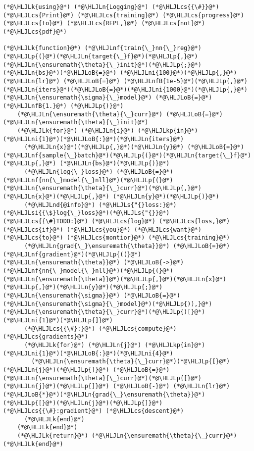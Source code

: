 \documentclass[12pt,a4paper]{article}
\newcommand{\HLJLk}[1]{\textcolor[RGB]{148,91,176}{\textbf{#1}}}
\newcommand{\HLJLkp}[1]{\textcolor[RGB]{148,91,176}{\textbf{#1}}}
\newcommand{\HLJLn}[1]{#1}
\newcommand{\HLJLnd}[1]{\textcolor[RGB]{214,102,97}{#1}}
\newcommand{\HLJLnf}[1]{\textcolor[RGB]{66,102,213}{#1}}
\newcommand{\HLJLs}[1]{\textcolor[RGB]{201,61,57}{#1}}
\newcommand{\HLJLsi}[1]{#1}
\newcommand{\HLJLnfB}[1]{\textcolor[RGB]{59,151,46}{#1}}
\newcommand{\HLJLni}[1]{\textcolor[RGB]{59,151,46}{#1}}
\newcommand{\HLJLoB}[1]{\textcolor[RGB]{102,102,102}{\textbf{#1}}}
\newcommand{\HLJLp}[1]{#1}
\newcommand{\HLJLcs}[1]{\textcolor[RGB]{153,153,119}{\textit{#1}}}
\begin{document}
\begin{lstlisting}
(*@\HLJLk{using}@*) (*@\HLJLn{Logging}@*) (*@\HLJLcs{{\#}}@*) (*@\HLJLcs{Print}@*) (*@\HLJLcs{training}@*) (*@\HLJLcs{progress}@*) (*@\HLJLcs{to}@*) (*@\HLJLcs{REPL,}@*) (*@\HLJLcs{not}@*) (*@\HLJLcs{pdf}@*)

(*@\HLJLk{function}@*) (*@\HLJLnf{train{\_}nn{\_}reg}@*)(*@\HLJLp{(}@*)(*@\HLJLn{target{\_}f}@*)(*@\HLJLp{,}@*) (*@\HLJLn{\ensuremath{\theta}{\_}init}@*)(*@\HLJLp{;}@*) (*@\HLJLn{bs}@*)(*@\HLJLoB{=}@*) (*@\HLJLni{100}@*)(*@\HLJLp{,}@*) (*@\HLJLn{lr}@*) (*@\HLJLoB{=}@*) (*@\HLJLnfB{1e-5}@*)(*@\HLJLp{,}@*) (*@\HLJLn{iters}@*)(*@\HLJLoB{=}@*)(*@\HLJLni{1000}@*)(*@\HLJLp{,}@*) (*@\HLJLn{\ensuremath{\sigma}{\_}model}@*) (*@\HLJLoB{=}@*) (*@\HLJLnfB{1.}@*) (*@\HLJLp{)}@*)
    (*@\HLJLn{\ensuremath{\theta}{\_}curr}@*) (*@\HLJLoB{=}@*) (*@\HLJLn{\ensuremath{\theta}{\_}init}@*)
    (*@\HLJLk{for}@*) (*@\HLJLn{i}@*) (*@\HLJLkp{in}@*) (*@\HLJLni{1}@*)(*@\HLJLoB{:}@*)(*@\HLJLn{iters}@*)
      (*@\HLJLn{x}@*)(*@\HLJLp{,}@*)(*@\HLJLn{y}@*) (*@\HLJLoB{=}@*) (*@\HLJLnf{sample{\_}batch}@*)(*@\HLJLp{(}@*)(*@\HLJLn{target{\_}f}@*)(*@\HLJLp{,}@*) (*@\HLJLn{bs}@*)(*@\HLJLp{)}@*)
      (*@\HLJLn{log{\_}loss}@*) (*@\HLJLoB{=}@*) (*@\HLJLnf{nn{\_}model{\_}nll}@*)(*@\HLJLp{(}@*)(*@\HLJLn{\ensuremath{\theta}{\_}curr}@*)(*@\HLJLp{,}@*) (*@\HLJLn{x}@*)(*@\HLJLp{,}@*) (*@\HLJLn{y}@*)(*@\HLJLp{)}@*)
      (*@\HLJLnd{@info}@*) (*@\HLJLs{"{}loss:}@*) (*@\HLJLsi{{\$}log{\_}loss}@*)(*@\HLJLs{"{}}@*) (*@\HLJLcs{{\#}TODO:}@*) (*@\HLJLcs{log}@*) (*@\HLJLcs{loss,}@*) (*@\HLJLcs{if}@*) (*@\HLJLcs{you}@*) (*@\HLJLcs{want}@*) (*@\HLJLcs{to}@*) (*@\HLJLcs{montior}@*) (*@\HLJLcs{training}@*)
      (*@\HLJLn{grad{\_}\ensuremath{\theta}}@*) (*@\HLJLoB{=}@*) (*@\HLJLnf{gradient}@*)(*@\HLJLp{((}@*)(*@\HLJLn{\ensuremath{\theta}}@*) (*@\HLJLoB{->}@*) (*@\HLJLnf{nn{\_}model{\_}nll}@*)(*@\HLJLp{(}@*)(*@\HLJLn{\ensuremath{\theta}}@*)(*@\HLJLp{,}@*)(*@\HLJLn{x}@*)(*@\HLJLp{,}@*)(*@\HLJLn{y}@*)(*@\HLJLp{;}@*) (*@\HLJLn{\ensuremath{\sigma}}@*) (*@\HLJLoB{=}@*) (*@\HLJLn{\ensuremath{\sigma}{\_}model}@*)(*@\HLJLp{)),}@*) (*@\HLJLn{\ensuremath{\theta}{\_}curr}@*)(*@\HLJLp{)[}@*)(*@\HLJLni{1}@*)(*@\HLJLp{]}@*)
      (*@\HLJLcs{{\#}:}@*) (*@\HLJLcs{compute}@*) (*@\HLJLcs{gradients}@*)
      (*@\HLJLk{for}@*) (*@\HLJLn{j}@*) (*@\HLJLkp{in}@*) (*@\HLJLni{1}@*)(*@\HLJLoB{:}@*)(*@\HLJLni{4}@*)
        (*@\HLJLn{\ensuremath{\theta}{\_}curr}@*)(*@\HLJLp{[}@*)(*@\HLJLn{j}@*)(*@\HLJLp{]}@*) (*@\HLJLoB{=}@*) (*@\HLJLn{\ensuremath{\theta}{\_}curr}@*)(*@\HLJLp{[}@*)(*@\HLJLn{j}@*)(*@\HLJLp{]}@*) (*@\HLJLoB{-}@*) (*@\HLJLn{lr}@*)(*@\HLJLoB{*}@*)(*@\HLJLn{grad{\_}\ensuremath{\theta}}@*)(*@\HLJLp{[}@*)(*@\HLJLn{j}@*)(*@\HLJLp{]}@*)(*@\HLJLcs{{\#}:gradient}@*) (*@\HLJLcs{descent}@*)
      (*@\HLJLk{end}@*)
    (*@\HLJLk{end}@*)
    (*@\HLJLk{return}@*) (*@\HLJLn{\ensuremath{\theta}{\_}curr}@*)
(*@\HLJLk{end}@*)
\end{lstlisting}
\end{document}
